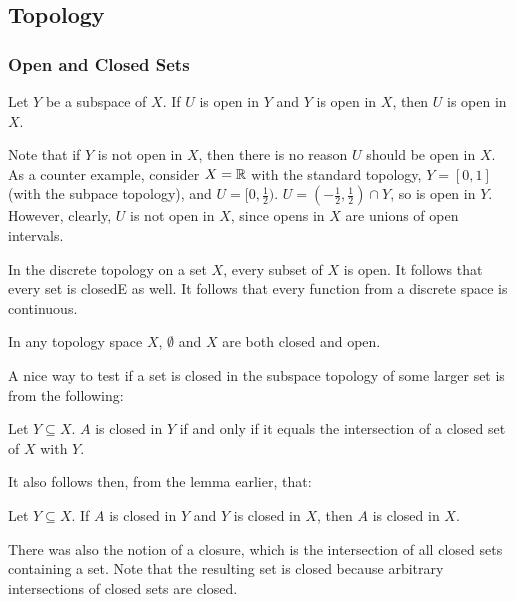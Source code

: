 \subsection{Topology}

\subsubsection{Open and Closed Sets}

\begin{lemma}
    Let $Y$ be a subspace of $X$. If $U$ is open in $Y$ and $Y$ is open in $X$, then
    $U$ is open in $X$.
\end{lemma}

\begin{remark}
    Note that if $Y$ is not open in $X$, then there is no reason $U$ should be open in $X$.
    As a counter example, consider $X = \mathbb{R}$ with the standard topology, $Y = [0,1]$ (with the 
    subpace topology), and $U = [0,\frac{1}{2})$. $U = (-\frac{1}{2}, \frac{1}{2}) \cap Y$, 
    so is open in $Y$. However, clearly, $U$ is not open in $X$, since opens in $X$ are unions
    of open intervals.
\end{remark}

\begin{example}
In the discrete topology on a set $X$, every subset of $X$ is open.
It follows that every set is closedE as well. 
It follows that every function from a discrete space is continuous.
\end{example}

\begin{example}
    In any topology space $X$, $\emptyset$ and $X$ are both closed and open.
\end{example}

A nice way to test if a set is closed in the subspace topology of some 
larger set is from the following:

\begin{theorem}
    Let $Y \subseteq X$. $A$ is closed in $Y$ if and only if it equals 
    the intersection of a closed set of $X$ with $Y$.
\end{theorem}

It also follows then, from the lemma earlier, that:
\begin{corollary}
    Let $Y \subseteq X$. If $A$ is closed in $Y$ and $Y$ is closed in $X$, 
    then $A$ is closed in $X$.
\end{corollary}

There was also the notion of a closure, which is the intersection of all closed
sets containing a set. Note that the resulting set is closed because arbitrary 
intersections of closed sets are closed. 

